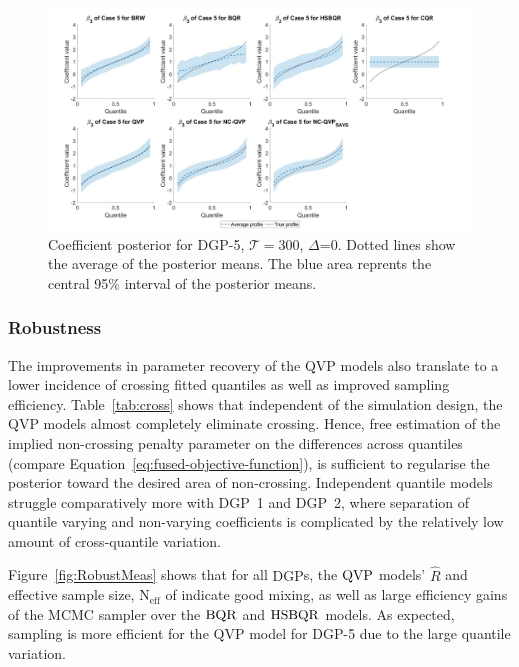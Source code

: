 \begin{figure}[h]
    \centering
    \includegraphics[width=\linewidth]{Figures/PresFig3_T=300.jpg}
    \caption{Coefficient posterior for $\mathrm{DGP}$-5, $\mathcal{T}=300$, $\varDelta$=0. Dotted lines show the average of the posterior means. The blue area reprents the central 95$\%$ interval of the posterior means.}
    \label{fig:C5}
\end{figure} 
%
\subsubsection{Robustness}
The improvements in parameter recovery of the $\mathrm{QVP}$ models also translate to a lower incidence of crossing fitted quantiles as well as improved sampling efficiency. Table~\ref{tab:cross} shows that independent of the simulation design, the $\mathrm{QVP}$ models almost completely eliminate crossing. Hence, free estimation of the implied non-crossing penalty parameter on the differences across quantiles (compare Equation~\ref{eq:fused-objective-function}), is sufficient to regularise the posterior toward the desired area of non-crossing. Independent quantile models struggle comparatively more with $\mathrm{DGP}$~1 and $\mathrm{DGP}$~2, where separation of quantile varying and non-varying coefficients is complicated by the relatively low amount of cross-quantile variation. 
%

Figure~\ref{fig:RobustMeas} shows that for all $\mathrm{DGP}$s, the $\operatorname{QVP}$ models' $\hat{R}$ and effective sample size, $\mathrm{N}_{\mathrm{eff}}$ of \citet{vehtari2021rank} indicate good mixing, as well as large efficiency gains of the $\mathrm{MCMC}$ sampler over the $\operatorname{BQR}$ and $\operatorname{HSBQR}$ models. As expected, sampling is more efficient for the $\mathrm{QVP}$ model for $\mathrm{DGP}$-5 due to the large quantile variation. 

